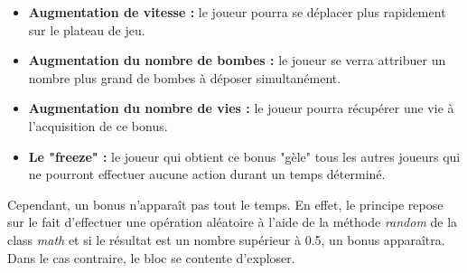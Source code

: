 \begin{itemize}
    \item \textbf{Augmentation de vitesse :} le joueur pourra se déplacer plus rapidement sur le plateau de jeu.
    \item \textbf{Augmentation du nombre de bombes :} le joueur se verra attribuer un nombre plus grand de bombes à déposer simultanément. 
    \item \textbf{Augmentation du nombre de vies :} le joueur pourra récupérer une vie à l'acquisition de ce bonus.
    \item \textbf{Le "freeze" :} le joueur qui obtient ce bonus "gèle" tous les autres joueurs qui ne pourront effectuer aucune action durant un temps déterminé.
\end{itemize}

Cependant, un bonus n'apparaît pas tout le temps. En effet, le principe repose sur le fait d'effectuer une opération aléatoire à l'aide de la méthode \textit{random} de la class \textit{math} et si le résultat est un nombre supérieur à 0.5, un bonus apparaîtra. Dans le cas contraire, le bloc se contente d'exploser. 
